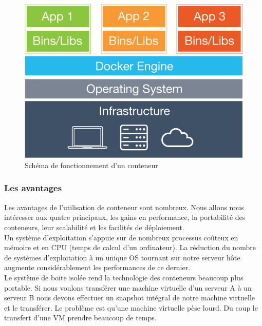       \begin{figure}
        \begin{center}
          \includegraphics[scale=0.2]{images/container.png}
        \end{center}
        \caption{Schéma de fonctionnement d'un conteneur}
        \label{Container}
      \end{figure}

      \subsubsection{Les avantages}
      Les avantages de l’utilisation de conteneur sont nombreux. Nous allons nous intéresser aux quatre principaux, les gains en performance, la portabilité des conteneurs, leur scalabilité et les facilités de déploiement.\\

      Un système d’exploitation s’appuie sur de nombreux processus coûteux en mémoire et en CPU (temps de calcul d’un ordinateur). La réduction du nombre de systèmes d’exploitation à un unique OS tournant sur notre serveur hôte augmente considérablement les performances de ce dernier.\\

      Le système de boite isolée rend la technologie des conteneurs beaucoup plus portable. Si nous voulons transférer une machine virtuelle d’un serveur A à un serveur B nous devons effectuer un snapshot intégral de notre machine virtuelle et le transférer. Le problème est qu’une machine virtuelle pèse lourd. Du coup le transfert d’une VM prendre beaucoup de temps.\\

